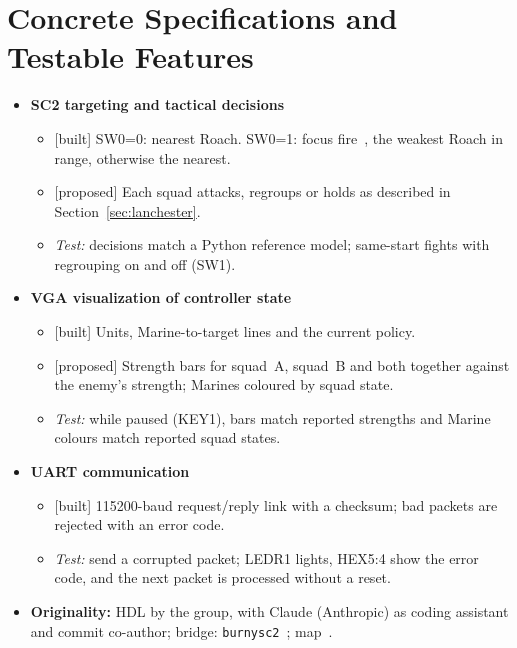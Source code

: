 \documentclass[10pt]{article}
\newcommand{\built}{\textsf{\scriptsize[built]}}
\newcommand{\prop}{\textsf{\scriptsize[proposed]}}
\begin{document}
\section{Concrete Specifications and Testable Features}\label{sec:tests}
{\small
\begin{itemize}
\item \textbf{SC2 targeting and tactical decisions}
  \begin{itemize}
  \item \built{} SW0=0: nearest Roach. SW0=1: focus fire~\cite{churchill}, the weakest Roach in range, otherwise the nearest.
  \item \prop{} Each squad attacks, regroups or holds as described in Section~\ref{sec:lanchester}.
  \item \emph{Test:} decisions match a Python reference model; same-start fights with regrouping on and off (SW1).
  \end{itemize}
\item \textbf{VGA visualization of controller state}
  \begin{itemize}
  \item \built{} Units, Marine-to-target lines and the current policy.
  \item \prop{} Strength bars for squad~A, squad~B and both together against the enemy's strength; Marines coloured by squad state.
  \item \emph{Test:} while paused (KEY1), bars match reported strengths and Marine colours match reported squad states.
  \end{itemize}
\item \textbf{UART communication}
  \begin{itemize}
  \item \built{} 115200-baud request/reply link with a checksum; bad packets are rejected with an error code.
  \item \emph{Test:} send a corrupted packet; LEDR1 lights, HEX5:4 show the error code, and the next packet is processed without a reset.
  \end{itemize}
\item \textbf{Originality:} HDL by the group, with Claude (Anthropic) as coding assistant and commit co-author; bridge: \texttt{burnysc2}~\cite{burnysc2}; map~\cite{pysc2}.
\end{itemize}
}
\end{document}
